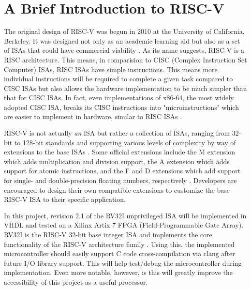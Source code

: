 \documentclass[lettersize,journal]{IEEEtran}
\begin{document}
\section{A Brief Introduction to RISC-V}
The original design of RISC-V was begun in 2010 at the University of California, Berkeley. 
It was designed not only as an academic learning aid but also as a set of ISAs that could have commercial viability \cite{riscvhistory}. 
As its name suggests, RISC-V is a RISC architecture. 
This means, in comparision to CISC (Complex Instruction Set Computer) ISAs, RISC ISAs have simple instructions. 
This means more individual instructions will be required to complete a given task compared to CISC ISAs but also allows the 
hardware implementation to be much simpler than that for CISC ISAs.
In fact, even implementations of x86-64, the most widely adopted CISC ISA, breaks its CISC instructions into "microinstructions" which are easier to implement in hardware, similar to RISC ISAs \cite{cisctorisc}.

RISC-V is not actually \textit{an} ISA but rather a collection of ISAs, 
ranging from 32-bit to 128-bit standards and supporting various levels of complexity by way of extensions to the base ISAs \cite{riscvunprovisioned}. 
Some official extensions include the M extension which adds multiplication and division support, 
the A extension which adds support for atomic instructions, and the F and D extensions which add support for single- and double-precision floating numbers, 
respectively \cite{riscvunprovisioned}. Developers are encouraged to design their own compatible extensions to customize the base RISC-V ISA to their specific application.

In this project, revision 2.1 of the RV32I unprivileged ISA will be implemented in VHDL and tested on a Xilinx Artix 7 FPGA (Field-Programmable Gate Array). 
RV32I is the RISC-V 32-bit base integer ISA and implements the core functionality of the RISC-V architecture family \cite{riscvunprovisioned}.
Using this, the implemented microcontroller should easily support C code cross-compilation via clang after future I/O library support.
This will help test/debug the microcontroller during implementation.
Even more notable, however, is this will greatly improve the accessibility of this project as a useful processor.
\end{document}
